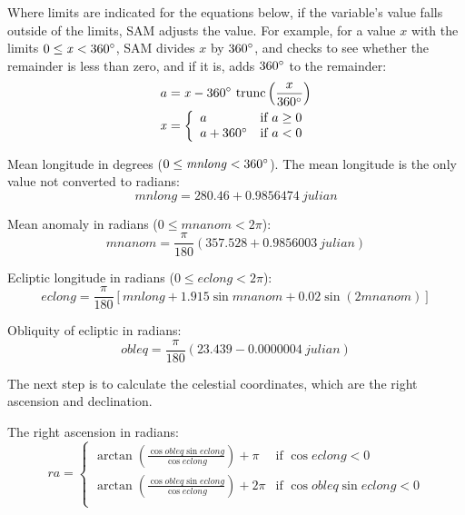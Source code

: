 \documentclass[12pt,letterpaper]{article}
\begin{document}
Where limits are indicated for the equations below, if the variable's value falls outside of the limits, SAM adjusts the value. For example, for a value $x$ with the limits $0\leq\mathit{x}<360\degree$, SAM divides $x$ by $360\degree$, and checks to see whether the remainder is less than zero, and if it is, adds $360\degree$ to the remainder:
\begin{align}\label{eqn-eclipticlimits}
a &= \mathit{x} - 360\degree~\text{trunc} \left(\frac{x}{360\degree}\right)\notag\\
\mathit{x}&= \left\{
  \begin{array}{ll}
    a & \text{if $a\geq0$}\\
    a+360\degree & \text{if $a<0$}
  \end{array}
\right.
\end{align}

Mean longitude in degrees ($0\leq\mathit{mnlong}<360\degree$). The mean longitude is the only value not converted to radians:
\begin{equation}\label{eqn-mnlong}
\mathit{mnlong} = 280.46 + 0.9856474~\mathit{julian}
\end{equation}

Mean anomaly in radians ($0\leq\mathit{mnanom}<2\pi$):
\begin{equation}\label{eqn-mnanom}
\mathit{mnanom} = \frac{\pi}{180}\left(357.528 + 0.9856003~\mathit{julian}\right)
\end{equation}

Ecliptic longitude in radians ($0\leq\mathit{eclong}<2\pi$):
\begin{equation}\label{eqn-eclong}
\mathit{eclong} = \frac{\pi}{180}\left[\mathit{mnlong} + 1.915\sin \mathit{mnanom} + 0.02\sin(2\mathit{mnanom})\right]
\end{equation}

Obliquity of ecliptic in radians:
\begin{equation}\label{eqn-oblqec}
\mathit{obleq} = \frac{\pi}{180}\left(23.439 - 0.0000004~\mathit{julian}\right)
\end{equation}

The next step is to calculate the celestial coordinates, which are the right ascension and declination.

The right ascension in radians:
\begin{equation}
\mathit{ra} = \left\{
\begin{array}{ll}
\arctan\left(  \frac{ \cos\mathit{\mathit{obleq}}\sin{\mathit{eclong}}}{\cos\mathit{eclong}}  \right) + \pi & \text{if $\cos\mathit{eclong}<0$}\\
\arctan\left(  \frac{ \cos\mathit{\mathit{obleq}}\sin{\mathit{eclong}}}{\cos\mathit{eclong}}  \right) + 2\pi & \text{if $\cos\mathit{obleq}\sin\mathit{eclong}<0$}\\
\end{array}
\right.
\end{equation}
\end{document}

